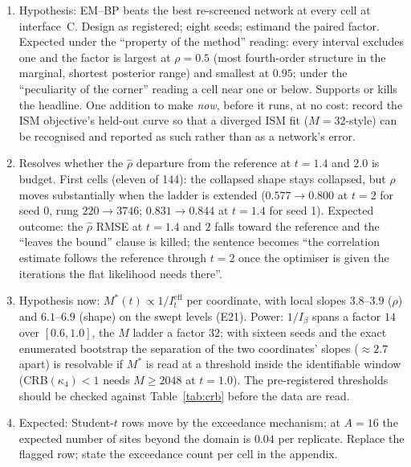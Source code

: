 \begin{enumerate}[label=\textbf{P0.\arabic*}]
\item {} Hypothesis: EM--BP beats the best re-screened network at every cell at interface~C. Design as registered; eight seeds; estimand the paired factor. Expected under the ``property of the method'' reading: every interval excludes one and the factor is largest at $\rho=0.5$ (most fourth-order structure in the marginal, shortest posterior range) and smallest at $0.95$; under the ``peculiarity of the corner'' reading a cell near one or below. Supports or kills the headline. One addition to make \emph{now}, before it runs, at no cost: record the ISM objective's held-out curve so that a diverged ISM fit ($M=32$-style) can be recognised and reported as such rather than as a network's error.
\item {} Resolves whether the $\hat\rho$ departure from the reference at $t=1.4$ and $2.0$ is budget. First cells (eleven of 144): the collapsed shape stays collapsed, but $\hat\rho$ moves substantially when the ladder is extended ($0.577\to0.800$ at $t=2$ for seed 0, rung $220\to3746$; $0.831\to0.844$ at $t=1.4$ for seed 1). Expected outcome: the $\hat\rho$ RMSE at $t=1.4$ and $2$ falls toward the reference and the ``leaves the bound'' clause is killed; the sentence becomes ``the correlation estimate follows the reference through $t=2$ once the optimiser is given the iterations the flat likelihood needs there''.
\item {} Hypothesis now: $M^\ast(t)\propto1/I^{\mathrm{eff}}_t$ per coordinate, with local slopes $3.8$--$3.9$ ($\rho$) and $6.1$--$6.9$ (shape) on the swept levels (E21). Power: $1/I_\beta$ spans a factor $14$ over $[0.6,1.0]$, the $M$ ladder a factor $32$; with sixteen seeds and the exact enumerated bootstrap the separation of the two coordinates' slopes ($\approx2.7$ apart) is resolvable if $M^\ast$ is read at a threshold inside the identifiable window (CRB$(\kappa_4)<1$ needs $M\ge2048$ at $t=1.0$). The pre-registered thresholds should be checked against Table~\ref{tab:crb} before the data are read.
\item {} Expected: Student-$t$ rows move by the exceedance mechanism; at $A=16$ the expected number of sites beyond the domain is $0.04$ per replicate. Replace the flagged row; state the exceedance count per cell in the appendix.

\end{enumerate}
